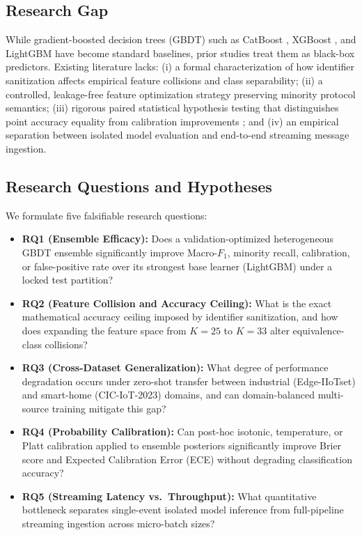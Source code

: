 \documentclass[10pt,journal,twocolumn]{IEEEtran}
\begin{document}
\subsection{Research Gap}
While gradient-boosted decision trees (GBDT) such as CatBoost \cite{ref9}, XGBoost \cite{ref11}, and LightGBM \cite{ref29} have become standard baselines, prior studies treat them as black-box predictors. Existing literature lacks: (i) a formal characterization of how identifier sanitization affects empirical feature collisions and class separability; (ii) a controlled, leakage-free feature optimization strategy preserving minority protocol semantics; (iii) rigorous paired statistical hypothesis testing that distinguishes point accuracy equality from calibration improvements \cite{ref17,ref18,ref20}; and (iv) an empirical separation between isolated model evaluation and end-to-end streaming message ingestion.

\subsection{Research Questions and Hypotheses}
We formulate five falsifiable research questions:
\begin{itemize}
    \item \textbf{RQ1 (Ensemble Efficacy):} Does a validation-optimized heterogeneous GBDT ensemble significantly improve Macro-$F_1$, minority recall, calibration, or false-positive rate over its strongest base learner (LightGBM) under a locked test partition?
    \item \textbf{RQ2 (Feature Collision and Accuracy Ceiling):} What is the exact mathematical accuracy ceiling imposed by identifier sanitization, and how does expanding the feature space from $K=25$ to $K=33$ alter equivalence-class collisions?
    \item \textbf{RQ3 (Cross-Dataset Generalization):} What degree of performance degradation occurs under zero-shot transfer between industrial (Edge-IIoTset) and smart-home (CIC-IoT-2023) domains, and can domain-balanced multi-source training mitigate this gap?
    \item \textbf{RQ4 (Probability Calibration):} Can post-hoc isotonic, temperature, or Platt calibration applied to ensemble posteriors significantly improve Brier score and Expected Calibration Error (ECE) without degrading classification accuracy?
    \item \textbf{RQ5 (Streaming Latency vs.\ Throughput):} What quantitative bottleneck separates single-event isolated model inference from full-pipeline streaming ingestion across micro-batch sizes?
\end{itemize}
\end{document}

